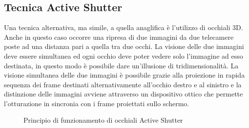 \documentclass[12pt,a4paper,openright,twoside]{book}
\begin{document}
    \subsection{Tecnica Active Shutter}
    Una tecnica alternativa, ma simile, a quella anaglifica è l'utilizzo di occhiali 3D.\\
    Anche in questo caso occorre una ripresa di due immagini da due telecamere poste ad una distanza pari a quella tra due occhi. La visione delle due immagini deve essere simultanea ed ogni occhio deve poter vedere solo l'immagine ad esso destinata, in questo modo è possibile dare un'illusione di tridimensionalità. La visione simultanea delle due immagini è possibile grazie alla proiezione in rapida sequenza dei frame destinati alternativamente all'occhio destro e al sinistro e la distinzione delle immagini avviene attraverso un dispositivo ottico che permette l'otturazione in sincronia con i frame proiettati sullo schermo.\cite{wiki:3dglass} \\
     \begin{figure}[h]
    	\centering
    	 \quad
    	\caption{Principio di funzionamento di occhiali Active Shutter}
    	\label{fig:shutter}
    \end{figure}
\end{document}

